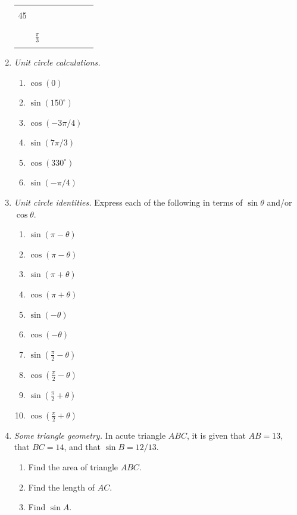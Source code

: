 \begin{enumerate}
\begin{center}
\begin{tabular}{c|c||c|c|c|c|c|c}
 & & & & & & & \\ \hline
 & & & & & & & \\
45 & & & & & & & \\
 & & & & & & & \\ \hline
 & & & & & & & \\
 & $\frac{\pi}{3}$ & & & & & & \\
 & & & & & & & 
\end{tabular}
\end{center}\newpage
\item \emph{Unit circle calculations.}
\begin{enumerate}
\item $\cos(0)$
\item $\sin(150^{\circ})$
\item $\cos(-3\pi/4)$
\item $\sin(7\pi/3)$
\item $\cos(330^{\circ})$
\item $\sin(-\pi/4)$
\end{enumerate}
\item \emph{Unit circle identities.} Express each of the following in terms of $\sin\theta$ and/or $\cos\theta$.
\begin{enumerate}
\item $\sin(\pi - \theta)$
\item $\cos(\pi - \theta)$
\item $\sin(\pi + \theta)$
\item $\cos(\pi + \theta)$
\item $\sin(-\theta)$
\item $\cos(-\theta)$
\item $\sin(\frac{\pi}{2} - \theta)$
\item $\cos(\frac{\pi}{2} - \theta)$
\item $\sin(\frac{\pi}{2} + \theta)$
\item $\cos(\frac{\pi}{2} + \theta)$
\end{enumerate}
\item \emph{Some triangle geometry.} In acute triangle $ABC$, it is given that $AB = 13$, that $BC = 14$, and that $\sin B = 12/13$.
\begin{enumerate}
\item Find the area of triangle $ABC$.
\item Find the length of $AC$.
\item Find $\sin A$.
\end{enumerate}
\end{enumerate}


